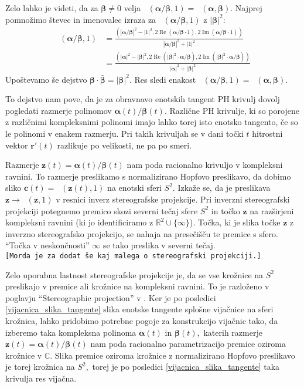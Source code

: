 \documentclass[12pt,a4paper,twoside]{article}
\theoremstyle{definition} %
\theoremstyle{plain} %
\numberwithin{equation}{section}  %
\newcommand{\R}{\mathbb R}
\renewcommand{\C}{\mathbb C}
\newcommand{\cV}{\mathbf{c}}
\newcommand{\rV}{\mathbf{r}}
\newcommand{\zV}{\mathbf{z}}
\newcommand{\balpha}{\boldsymbol \alpha}
\newcommand{\bbeta}{\boldsymbol \beta}
\DeclareMathOperator{\ReC}{Re}
\DeclareMathOperator{\ImC}{Im}
\DeclareMathOperator{\nhopf}{\hat{H}}
\begin{document}
Zelo lahko je videti, da za $\bbeta\neq0$ velja $\nhopf(\balpha/\bbeta,1)=\nhopf(\balpha,\bbeta).$ Najprej pomnožimo števec in imenovalec izraza za $\nhopf(\balpha/\bbeta,1)$ z $|\bbeta|^2:$
\begin{align*}
	\nhopf\left(\balpha/\bbeta,1\right)&=\frac{(|\balpha/\bbeta|^2-|1|^2,2\ReC(\balpha/\bbeta\cdot 1),2\ImC(\balpha/\bbeta\cdot 1))}{|\balpha/\bbeta|^2+|1|^2}\\
	&=\frac{(|\balpha|^2-|\bbeta|^2,2\ReC(|\bbeta|^2\cdot\balpha/\bbeta),2\ImC(|\bbeta|^2\cdot\balpha/\bbeta))}{|\balpha|^2+|\bbeta|^2}
\end{align*}
Upoštevamo še dejstvo $\bbeta\cdot\bar{\bbeta}=|\bbeta|^2.$ Res sledi enakost $\nhopf(\balpha/\bbeta,1)=\nhopf(\balpha,\bbeta).$

To dejstvo nam pove, da je za obravnavo enotskih tangent PH krivulj dovolj pogledati razmerje polinomov $\balpha(t)/\bbeta(t).$ Različne PH krivulje, ki so porojene z različnimi kompleksnimi polinomi imajo lahko torej isto enotsko tangento, če so le polinomi v enakem razmerju. Pri takih krivuljah se v dani točki $t$ hitrostni vektor $\rV'(t)$ razlikuje po velikosti, ne pa po smeri.

Razmerje $\zV(t)=\balpha(t)/\bbeta(t)$ nam poda racionalno krivuljo v kompleksni ravnini. To razmerje preslikamo s normalizirano Hopfovo preslikavo, da dobimo sliko $\cV(t)=\nhopf(\zV(t),1)$ na enotski sferi $S^2.$ Izkaže se, da je preslikava $\zV\to\nhopf(\zV,1)$ v resnici inverz stereografske projekcije. Pri inverzni stereografski projekciji potegnemo premico skozi severni tečaj sfere $S^2$ in točko $\zV$ na razširjeni kompleksni ravnini (ki jo identificiramo z $\R^2\cup\{\infty\}$). Točka, ki je slika točke $\zV$ z inverzno stereografsko projekcijo, se nahaja na presečišču te premice s sfero. ``Točka v neskončnosti'' $\infty$ se tako preslika v severni tečaj.\\
\texttt{[Morda je za dodat še kaj malega o stereografski projekciji.]}

Zelo uporabna lastnost stereografske projekcije je, da se vse krožnice na $S^2$ preslikajo v premice ali krožnice na kompleksni ravnini. To je razloženo v poglavju ``Stereographic projection'' v \cite{needham1998visual}. Ker je po posledici \ref{vijacnica_slika_tangente} slika enotske tangente splošne vijačnice na sferi krožnica, lahko pridobimo potrebne pogoje za konstrukcijo vijačnic tako, da izberemo taka kompleksna polinoma $\balpha(t)$ in $\bbeta(t),$ katerih razmerje $\zV(t)=\balpha(t)/\bbeta(t)$ nam poda racionalno parametrizacijo premice oziroma krožnice v $\C.$ Slika premice oziroma krožnice z normalizirano Hopfovo preslikavo je torej krožnica na $S^2,$ torej je po posledici \ref{vijacnica_slika_tangente} taka krivulja res vijačna.
\end{document}
